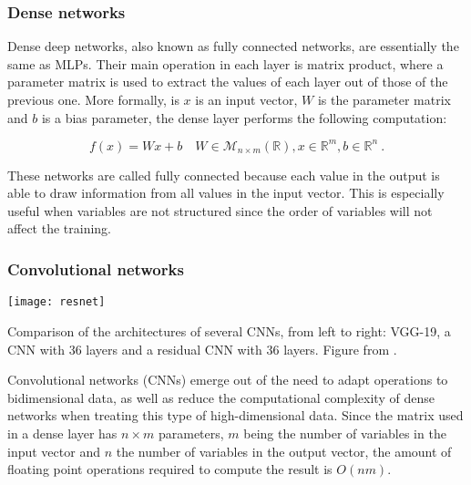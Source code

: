 \subsubsection{Dense networks}

Dense deep networks, also known as fully connected networks, are essentially the same as MLPs. Their main operation in each layer is matrix product, where a parameter matrix is used to extract the values of each layer out of those of the previous one. More formally, is $x$ is an input vector, $W$ is the parameter matrix and $b$ is a bias parameter, the dense layer performs the following computation:

\begin{equation}
    f(x)=Wx + b\quad W\in \mathcal M_{n\times m}(\mathbb R), x\in\mathbb R^m, b\in\mathbb R^n~.
\end{equation}

These networks are called fully connected because each value in the output is able to draw information from all values in the input vector. This is especially useful when variables are not structured since the order of variables  will not affect the training.

\subsubsection{Convolutional networks}

\begin{marginfigure}
    \texttt{[image: resnet]}
    \caption[Comparison of the architectures of several CNNs.]{\label{fig:resnet}Comparison of the architectures of several CNNs, from left to right: VGG-19, a CNN with 36 layers and a residual CNN with 36 layers. Figure from \cite{he2016deep}.}
\end{marginfigure}


Convolutional networks (CNNs) emerge out of the need to adapt operations to bidimensional data, as well as reduce the computational complexity of dense networks when treating this type of high-dimensional data. Since the matrix used in a dense layer has $n\times m$ parameters, $m$ being the number of variables in the input vector and $n$ the number of variables in the output vector, the amount of floating point operations required to compute the result is $O\left(nm\right)$.

